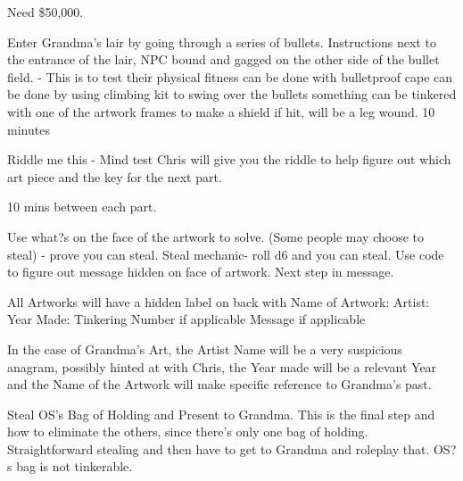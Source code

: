 \documentclass[green]{LRSguildcamp1}
\begin{document}

Need \$50,000.  

Enter Grandma's lair by going through a series of bullets. Instructions next to the entrance of the lair, NPC bound and gagged on the other side of the bullet field.  - This is to test their physical fitness
can be done with bulletproof cape
can be done by using climbing kit to swing over the bullets
something can be tinkered with one of the artwork frames to make a shield
if hit, will be a leg wound. 
10 minutes 
 
Riddle me this - Mind test
Chris will give you the riddle to help figure out which art piece and the key for the next part. 
 
10 mins between each part. 

Use what?s on the face of the artwork to solve. (Some people may choose to steal) - prove you can steal.   Steal mechanic- roll d6 and you can steal. Use code to figure out message hidden on face of artwork. Next step in message.  

All Artworks will have a hidden label on back with 
Name of Artwork: 
Artist: 
Year Made: 
Tinkering Number if applicable
Message if applicable

In the case of Grandma's Art, the Artist Name will be a very suspicious anagram, possibly hinted at with Chris, the Year made will be a relevant Year and the Name of the Artwork will make specific reference to Grandma's past.


Steal OS's Bag of Holding and Present to Grandma. This is the final step and how to eliminate the others, since there's only one bag of holding. Straightforward stealing and then have to get to Grandma and roleplay that. OS?s bag is not tinkerable.  
\end{document}
